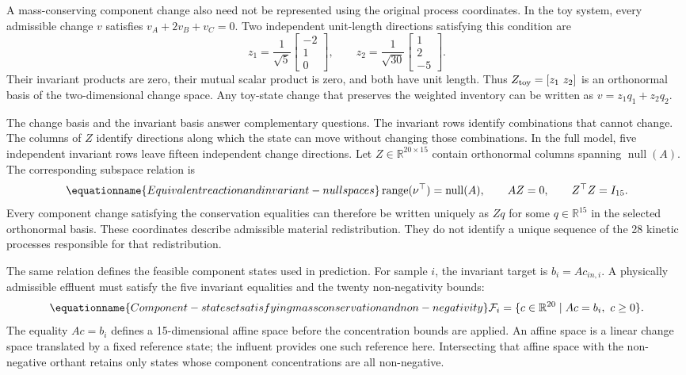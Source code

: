 A mass-conserving component change also need not be represented using the original process coordinates. In the toy system, every admissible change $v$ satisfies
$v_A+2v_B+v_C=0$. Two independent unit-length directions satisfying this condition are
\[
z_1=\frac1{\sqrt5}\begin{bmatrix}-2\\1\\0\end{bmatrix},\qquad
z_2=\frac1{\sqrt{30}}\begin{bmatrix}1\\2\\-5\end{bmatrix}.
\]
Their invariant products are zero, their mutual scalar product is zero, and both have unit length. Thus
$Z_{\rm toy}=[z_1\ z_2]$ is an orthonormal basis of the two-dimensional change space. Any toy-state change that preserves the weighted inventory can be written as
$v=z_1q_1+z_2q_2$.

The change basis and the invariant basis answer complementary questions. The invariant rows identify combinations that cannot change. The columns of $Z$ identify directions along which the state can move without changing those combinations. In the full model, five independent invariant rows leave fifteen independent change directions. Let
$Z\in\mathbb{R}^{20\times15}$ contain orthonormal columns spanning $\operatorname{null}(A)$. The corresponding subspace relation is
\begin{equation}
\equationname{Equivalent reaction and invariant-null spaces}
\operatorname{range}(\nu^\top)=\operatorname{null}(A),\qquad
AZ=0,\qquad Z^\top Z=I_{15}.
\label{eq:reaction_invariant_subspaces}
\end{equation}
Every component change satisfying the conservation equalities can therefore be written uniquely as $Zq$ for some $q\in\mathbb{R}^{15}$ in the selected orthonormal basis. These coordinates describe admissible material redistribution. They do not identify a unique sequence of the 28 kinetic processes responsible for that redistribution.

The same relation defines the feasible component states used in prediction. For sample $i$, the invariant target is
$b_i=Ac_{in,i}$. A physically admissible effluent must satisfy the five invariant equalities and the twenty non-negativity bounds:
\begin{equation}
\equationname{Component-state set satisfying mass conservation and non-negativity}
\mathcal{F}_i=\{c\in\mathbb{R}^{20}\mid Ac=b_i,\ c\geq0\}.
\label{eq:reactor_feasible_set}
\end{equation}
The equality $Ac=b_i$ defines a 15-dimensional affine space before the concentration bounds are applied. An affine space is a linear change space translated by a fixed reference state; the influent provides one such reference here. Intersecting that affine space with the non-negative orthant retains only states whose component concentrations are all non-negative.

